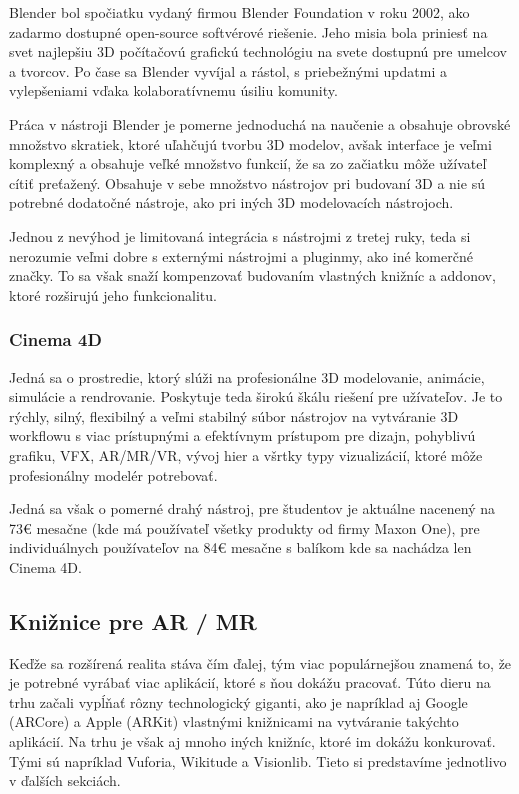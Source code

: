 Blender bol spočiatku vydaný firmou Blender Foundation v roku 2002, ako zadarmo dostupné open-source softvérové riešenie. Jeho misia bola priniesť na svet najlepšiu 3D počítačovú grafickú technológiu na svete dostupnú pre umelcov a tvorcov. Po čase sa Blender vyvíjal a rástol, s priebežnými updatmi a vylepšeniami vďaka kolaboratívnemu úsiliu komunity. 

Práca v nástroji Blender je pomerne jednoduchá na naučenie a obsahuje obrovské množstvo skratiek, ktoré uľahčujú tvorbu 3D modelov, avšak interface je veľmi komplexný a obsahuje veľké množstvo funkcií, že sa zo začiatku môže užívateľ cítiť preťažený. Obsahuje v sebe množstvo nástrojov pri budovaní 3D a nie sú potrebné dodatočné nástroje, ako pri iných 3D modelovacích nástrojoch. 

Jednou z nevýhod je limitovaná integrácia s nástrojmi z tretej ruky, teda si nerozumie veľmi dobre s externými nástrojmi a pluginmy, ako iné komerčné značky. To sa však snaží kompenzovať budovaním vlastných knižníc a addonov, ktoré rozširujú jeho funkcionalitu. \cite{hill2023blender}

\subsubsection{Cinema 4D}

Jedná sa o prostredie, ktorý slúži na profesionálne 3D modelovanie, animácie, simulácie a rendrovanie. Poskytuje teda širokú škálu riešení pre užívateľov. Je to rýchly, silný, flexibilný a veľmi stabilný súbor nástrojov na vytváranie 3D workflowu s viac prístupnými a efektívnym prístupom pre dizajn, pohyblivú grafiku, VFX, AR/MR/VR, vývoj hier a všrtky typy vizualizácií, ktoré môže profesionálny modelér potrebovať. \cite{maxon2024cinema4d}

Jedná sa však o pomerné drahý nástroj, pre študentov je aktuálne nacenený na 73€ mesačne (kde má používateľ všetky produkty od firmy Maxon One), pre individuálnych používateľov na 84€ mesačne s balíkom kde sa nachádza len Cinema 4D. \cite{maxon2024buy}

\subsection{Knižnice pre AR / MR}
Keďže sa rozšírená realita stáva čím ďalej, tým viac populárnejšou znamená to, že je potrebné vyrábať viac aplikácií, ktoré s ňou dokážu pracovať. Túto dieru na trhu začali vypĺňať rôzny technologický giganti, ako je napríklad aj Google (ARCore) a Apple (ARKit) vlastnými knižnicami na vytváranie takýchto aplikácií. Na trhu je však aj mnoho iných knižníc, ktoré im dokážu konkurovať. Tými sú napríklad Vuforia, Wikitude a Visionlib. Tieto si predstavíme jednotlivo v ďalších sekciách.

